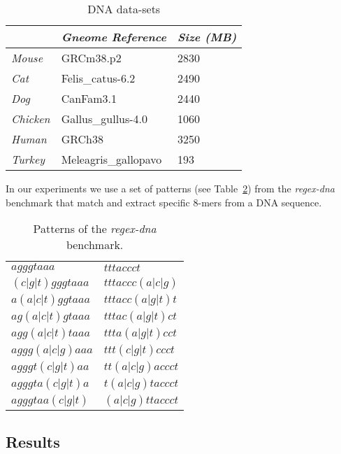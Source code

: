 \documentclass[conference]{IEEEtran}
\begin{document}
\begin{table}[h]
		\renewcommand{\arraystretch}{1.3}
		\caption{DNA data-sets}
		\label{table:dna-sequences}
		\centering
		\begin{tabular}{lll}
			\toprule
			& \emph{Gneome Reference}   	 & \emph{Size (MB)} \\ \midrule
			\emph{Mouse}   & GRCm38.p2        		 & 2830      \\ 
			\emph{Cat}     & Felis\_catus-6.2  	 & 2490      \\ 
			\emph{Dog}     & CanFam3.1          	 & 2440      \\ 
			\emph{Chicken} & Gallus\_gullus-4.0	 & 1060      \\ 
			\emph{Human}   & GRCh38            	 & 3250      \\ 
			\emph{Turkey}  & Meleagris\_gallopavo   & 193       \\ \bottomrule
		\end{tabular}
\end{table}
	
In our experiments we use a set of patterns (see Table~\ref{table:regex}) from the \emph{regex-dna} \cite{REGEX_DNA} benchmark that match and extract specific 8-mers from a DNA sequence. 

\begin{table}[ht]
			\renewcommand{\arraystretch}{1.3}
			\caption{Patterns of the \emph{regex-dna} benchmark.}
			\label{table:regex}
			\centering
			\begin{tabular}{ p{2.5cm} p{2.5cm} }
				\hline 
				$agggtaaa$ & $tttaccct$\\
				$(c|g|t)gggtaaa$ & $tttaccc(a|c|g)$\\
				$a(a|c|t)ggtaaa$ & $tttacc(a|g|t)t$\\
				$ag(a|c|t)gtaaa$ & $tttac(a|g|t)ct$\\
				$agg(a|c|t)taaa$ & $ttta(a|g|t)cct$\\
				$aggg(a|c|g)aaa$ & $ttt(c|g|t)ccct$\\
				$agggt(c|g|t)aa$ & $tt(a|c|g)accct$\\
				$agggta(c|g|t)a$ & $t(a|c|g)taccct$\\
				$agggtaa(c|g|t)$ & $(a|c|g)ttaccct$\\
				\hline
			\end{tabular}
\end{table}


\subsection{Results}
\end{document}
